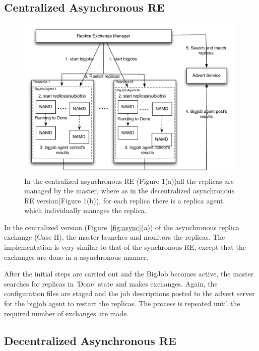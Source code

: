 \documentclass[a4paper,10pt]{article}
\begin{document}
\subsection{Centralized Asynchronous RE}

\begin{figure}
\centering
\includegraphics[width=1\textwidth]{figures/centralized.pdf}
\caption{\small In the centralized asynchronous RE (Figure 1(a))all the replicas are managed by the master, where as in the decentralized asynchronous RE version(Figure 1(b)), for each replica there is a replica agent which individually manages the replica.}
\label{fig:cent}
\end{figure}

In the centralized version (Figure~\ref{fig:async}(a)) of the asynchronous replica exchange (Case II), the master launches and monitors the replicas. The implementation is very similar to that of the synchronous RE, except that the exchanges are done in a asynchronous manner. 

After the initial steps are carried out and the BigJob becomes active, the master searches for replicas in 'Done' state and makes exchanges. Again, the configuration files are staged and the job descriptions posted to the advert server for the bigjob agent to restart the replicas.%
The process is repeated until the required number of exchanges are made.

\subsection{Decentralized Asynchronous RE}
\end{document}

